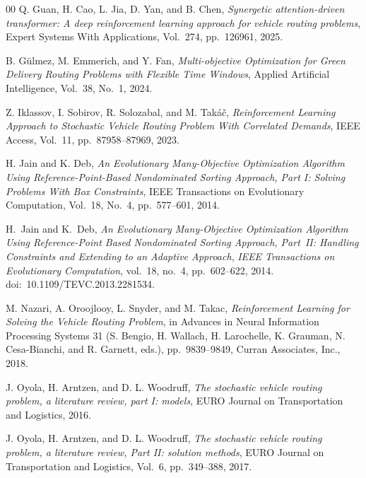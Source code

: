 \documentclass[preprint,12pt]{elsarticle}
\begin{document}
\begin{thebibliography}{00}
Q. Guan, H. Cao, L. Jia, D. Yan, and B. Chen,
\textit{Synergetic attention-driven transformer: A deep reinforcement learning approach for vehicle routing problems},
Expert Systems With Applications,
Vol.~274, pp.~126961, 2025.

B. Gülmez, M. Emmerich, and Y. Fan,
\textit{Multi-objective Optimization for Green Delivery Routing Problems with Flexible Time Windows},
Applied Artificial Intelligence,
Vol.~38, No.~1, 2024.

Z. Iklassov, I. Sobirov, R. Solozabal, and M. Takáč,
\textit{Reinforcement Learning Approach to Stochastic Vehicle Routing Problem With Correlated Demands},
IEEE Access,
Vol.~11, pp.~87958--87969, 2023.



H. Jain and K. Deb,
\textit{An Evolutionary Many-Objective Optimization Algorithm Using Reference-Point-Based Nondominated Sorting Approach, Part I: Solving Problems With Box Constraints},
IEEE Transactions on Evolutionary Computation,
Vol.~18, No.~4, pp.~577--601, 2014.


H.~Jain and K.~Deb,
\textit{An Evolutionary Many-Objective Optimization Algorithm Using Reference-Point Based Nondominated Sorting Approach, Part~II: Handling Constraints and Extending to an Adaptive Approach},
\emph{IEEE Transactions on Evolutionary Computation},
vol.~18, no.~4, pp.~602--622, 2014.
doi:~10.1109/TEVC.2013.2281534.


M. Nazari, A. Oroojlooy, L. Snyder, and M. Takac,
\textit{Reinforcement Learning for Solving the Vehicle Routing Problem},
in Advances in Neural Information Processing Systems 31 (S. Bengio, H. Wallach, H. Larochelle, K. Grauman, N. Cesa-Bianchi, and R. Garnett, eds.),
pp.~9839--9849, Curran Associates, Inc., 2018.


J. Oyola, H. Arntzen, and D. L. Woodruff,
\textit{The stochastic vehicle routing problem, a literature review, part I: models},
EURO Journal on Transportation and Logistics,
2016.

J. Oyola, H. Arntzen, and D. L. Woodruff,
\textit{The stochastic vehicle routing problem, a literature review, Part II: solution methods},
EURO Journal on Transportation and Logistics,
Vol.~6, pp.~349--388, 2017.


\end{thebibliography}
\end{document}
